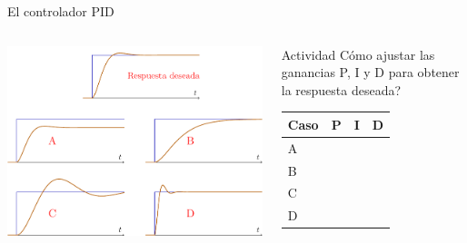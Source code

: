 \documentclass[presentation,aspectratio=169, usenames, dvipsnames]{beamer}
\begin{document}
\begin{frame}[label={sec:org0b4160a}]{El controlador PID}
\begin{columns}
\begin{column}{0.6\columnwidth}
\begin{center}
\includegraphics[width=0.99\linewidth]{../../figures/stepresponse-secondorder-exercise}
\end{center}
\end{column}

\begin{column}{0.4\columnwidth}
\alert{Actividad} Cómo ajustar las ganancias P, I y D para obtener la respuesta deseada?

\begin{center}
\begin{tabular}{llll}
Caso & \textcolor{ppc}{P} & \textcolor{iic}{I} & \textcolor{ddc}{D}\\
\hline
A &  &  & \\
B &  &  & \\
C &  &  & \\
D &  &  & \\
\hline
\end{tabular}
\end{center}
\end{column}
\end{columns}
\end{frame}
\end{document}
